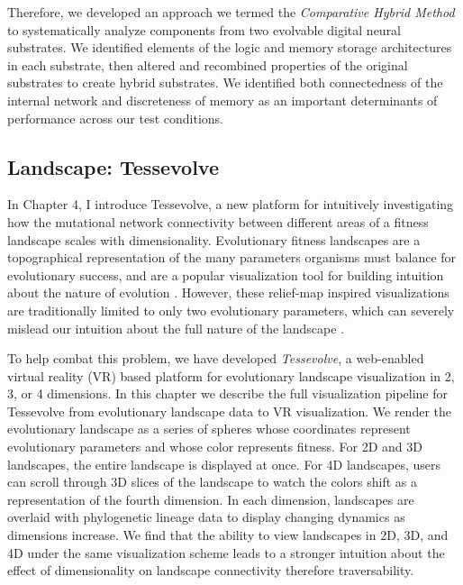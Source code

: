 Therefore, we developed an approach we termed the \textit{Comparative Hybrid Method} to systematically analyze components from two evolvable digital neural substrates.
We identified elements of the logic and memory storage architectures in each substrate, then altered and recombined properties of the original substrates to create hybrid substrates. 
We identified both connectedness of the internal network and discreteness of memory as an important determinants of performance across our test conditions.

\subsection{Landscape: Tessevolve}

In Chapter 4, I introduce Tessevolve, a new platform for intuitively investigating how the mutational network connectivity between different areas of a fitness landscape scales with dimensionality. 
Evolutionary fitness landscapes are a topographical representation of the many parameters organisms must balance for evolutionary success, and are a popular visualization tool for building intuition about the nature of evolution \citep{wright_roles_1932}. 
However, these relief-map inspired visualizations are traditionally limited to only two evolutionary parameters, which can severely mislead our intuition about the full nature of the landscape \citep{kaplan_end_2008, agarwala_adaptive_2019}. 

To help combat this problem, we have developed \textit{Tessevolve}, a web-enabled virtual reality (VR) based platform for evolutionary landscape visualization in 2, 3, or 4 dimensions. 
In this chapter we describe the full visualization pipeline for Tessevolve from evolutionary landscape data to VR visualization. 
We render the evolutionary landscape as a series of spheres whose coordinates represent evolutionary parameters and whose color represents fitness. For 2D and 3D landscapes, the entire landscape is displayed at once. 
For 4D landscapes, users can scroll through 3D slices of the landscape to watch the colors shift as a representation of the fourth dimension. In each dimension, landscapes are overlaid with phylogenetic lineage data to display changing dynamics as dimensions increase. 
We find that the ability to view landscapes in 2D, 3D, and 4D under the same visualization scheme leads to a stronger intuition about the effect of dimensionality on landscape connectivity therefore traversability. 